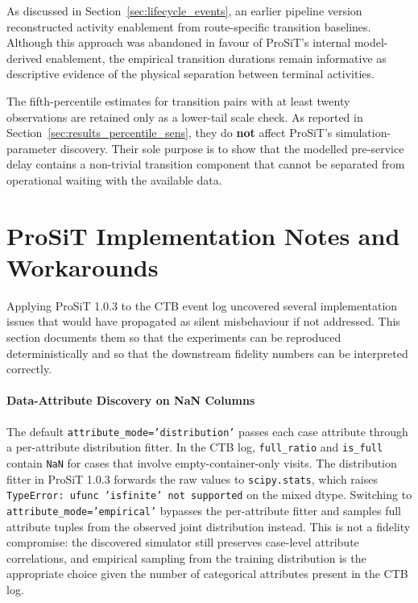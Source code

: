 As discussed in Section~\ref{sec:lifecycle_events}, an earlier
pipeline version reconstructed activity enablement from route-specific
transition baselines. Although this approach was abandoned in favour of
ProSiT's internal model-derived enablement, the empirical transition
durations remain informative as descriptive evidence of the physical
separation between terminal activities.

The fifth-percentile estimates for transition pairs with at least twenty
observations are retained only as a lower-tail scale check. As reported in
Section~\ref{sec:results_percentile_sens}, they do \textbf{not} affect ProSiT's
simulation-parameter discovery. Their sole purpose is to show that the
modelled pre-service delay contains a non-trivial transition component that
cannot be separated from operational waiting with the available data.

\section{ProSiT Implementation Notes and Workarounds}
\label{sec:prosit_workarounds}

Applying ProSiT 1.0.3 \cite{Vinci2026prosit} to the CTB event log
uncovered several implementation issues that would have propagated as
silent misbehaviour if not addressed. This section documents them so
that the experiments can be reproduced deterministically and so that the
downstream fidelity numbers can be interpreted correctly.

\paragraph{Data-Attribute Discovery on NaN Columns}

The default \texttt{attribute\_mode='distribution'} passes each case
attribute through a per-attribute distribution fitter. In the CTB log,
\texttt{full\_ratio} and \texttt{is\_full} contain \texttt{NaN} for
cases that involve empty-container-only visits. The distribution fitter
in ProSiT 1.0.3 forwards the raw values to
\texttt{scipy.stats}, which raises
\texttt{TypeError: ufunc 'isfinite' not supported} on the mixed
dtype. Switching to \texttt{attribute\_mode='empirical'} bypasses the
per-attribute fitter and samples full attribute tuples from the
observed joint distribution instead. This is not a fidelity compromise:
the discovered simulator still preserves case-level attribute
correlations, and empirical sampling from the training distribution is
the appropriate choice given the number of categorical attributes
present in the CTB log.

